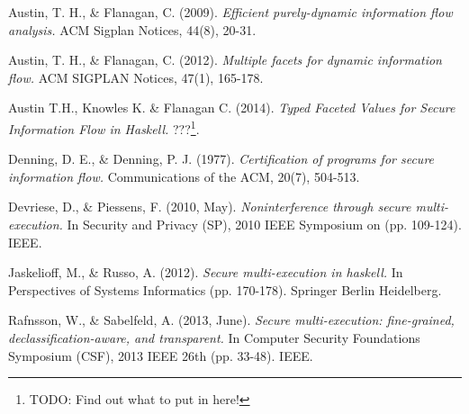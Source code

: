 \documentclass[12pt,a4paper]{article}
\begin{document}
	\begin{thebibliography}{9}
		
		Austin, T. H., \& Flanagan, C. (2009). 
		\textit{Efficient purely-dynamic information flow analysis. }
		ACM Sigplan Notices, 44(8), 20-31.
		
		Austin, T. H., \& Flanagan, C. (2012). 
		\textit{Multiple facets for dynamic information flow. }
		ACM SIGPLAN Notices, 47(1), 165-178.
		
		Austin T.H., Knowles K. \& Flanagan C. (2014).
		\textit{Typed Faceted Values for Secure Information Flow in Haskell.}
		???\footnote{TODO: Find out what to put in here!}.
		
		Denning, D. E., \& Denning, P. J. (1977). 
		\textit{Certification of programs for secure information flow. }
		Communications of the ACM, 20(7), 504-513.
		
		Devriese, D., \& Piessens, F. (2010, May). 
		\textit{Noninterference through secure multi-execution. }
		In Security and Privacy (SP), 2010 IEEE Symposium on (pp. 109-124). IEEE.
		
		Jaskelioff, M., \& Russo, A. (2012). 
		\textit{Secure multi-execution in haskell. }
		In Perspectives of Systems Informatics (pp. 170-178). Springer Berlin Heidelberg.
		
		Rafnsson, W., \& Sabelfeld, A. (2013, June). 
		\textit{Secure multi-execution: fine-grained, declassification-aware, and transparent. }
		In Computer Security Foundations Symposium (CSF), 2013 IEEE 26th (pp. 33-48). IEEE.
		
	\end{thebibliography}
	
\end{document}

